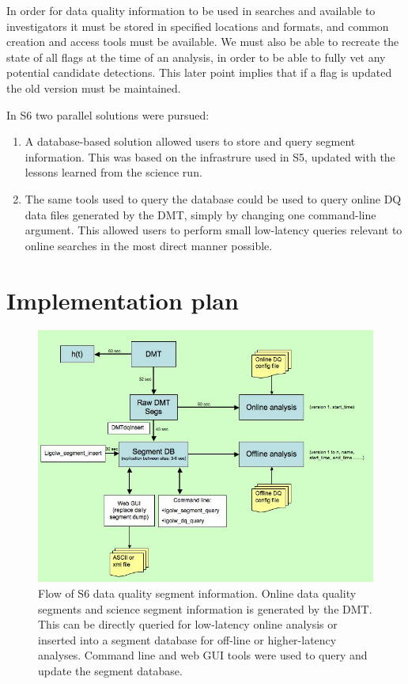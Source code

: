 In order for data quality information to be used in searches and
available to investigators it must be stored in specified locations
and formats, and common creation and access tools must be available.
We must also be able to recreate the state of all flags at the time of
an analysis, in order to be able to fully vet any potential candidate
detections.  This later point implies that if a flag is updated the
old version must be maintained.

In S6 two parallel solutions were pursued:
\begin{enumerate}
\item A database-based solution allowed users to store and query segment
information. This was based on the infrastrure used in S5, updated with
the lessons learned from the science run.
\item The same tools used to query the database could be used 
to query online DQ data files generated by the DMT, simply by
changing one command-line argument. This allowed 
users to perform small low-latency queries relevant to online
searches in the most direct manner possible.
\end{enumerate}

\section{Implementation plan}

\begin{figure}[h]
  \begin{center}
    \includegraphics[width=0.9\linewidth]{figures/segdb/T0900005_fig1}
  \end{center}
  \caption[Flow of S6 data quality information]{
  Flow of S6 data quality segment information. Online data
  quality segments and science segment information is generated by the DMT.
  This can be directly queried for low-latency online analysis or inserted
  into a segment database for off-line or higher-latency analyses. Command
  line and web GUI tools were used to query and update the segment
  database.} 
\end{figure}


